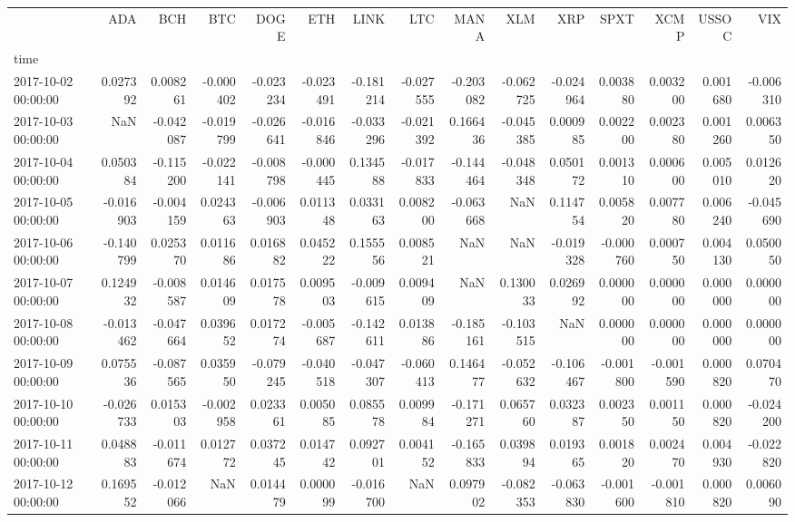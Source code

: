 \begin{tabular}{lrrrrrrrrrrrrrr}
\toprule
 & ADA & BCH & BTC & DOGE & ETH & LINK & LTC & MANA & XLM & XRP & SPXT & XCMP & USSOC & VIX \\
time &  &  &  &  &  &  &  &  &  &  &  &  &  &  \\
\midrule
2017-10-02 00:00:00 & 0.027392 & 0.008261 & -0.000402 & -0.023234 & -0.023491 & -0.181214 & -0.027555 & -0.203082 & -0.062725 & -0.024964 & 0.003880 & 0.003200 & 0.001680 & -0.006310 \\
2017-10-03 00:00:00 & NaN & -0.042087 & -0.019799 & -0.026641 & -0.016846 & -0.033296 & -0.021392 & 0.166436 & -0.045385 & 0.000985 & 0.002200 & 0.002380 & 0.001260 & 0.006350 \\
2017-10-04 00:00:00 & 0.050384 & -0.115200 & -0.022141 & -0.008798 & -0.000445 & 0.134588 & -0.017833 & -0.144464 & -0.048348 & 0.050172 & 0.001310 & 0.000600 & 0.005010 & 0.012620 \\
2017-10-05 00:00:00 & -0.016903 & -0.004159 & 0.024363 & -0.006903 & 0.011348 & 0.033163 & 0.008200 & -0.063668 & NaN & 0.114754 & 0.005820 & 0.007780 & 0.006240 & -0.045690 \\
2017-10-06 00:00:00 & -0.140799 & 0.025370 & 0.011686 & 0.016882 & 0.045222 & 0.155556 & 0.008521 & NaN & NaN & -0.019328 & -0.000760 & 0.000750 & 0.004130 & 0.050050 \\
2017-10-07 00:00:00 & 0.124932 & -0.008587 & 0.014609 & 0.017578 & 0.009503 & -0.009615 & 0.009409 & NaN & 0.130033 & 0.026992 & 0.000000 & 0.000000 & 0.000000 & 0.000000 \\
2017-10-08 00:00:00 & -0.013462 & -0.047664 & 0.039652 & 0.017274 & -0.005687 & -0.142611 & 0.013886 & -0.185161 & -0.103515 & NaN & 0.000000 & 0.000000 & 0.000000 & 0.000000 \\
2017-10-09 00:00:00 & 0.075536 & -0.087565 & 0.035950 & -0.079245 & -0.040518 & -0.047307 & -0.060413 & 0.146477 & -0.052632 & -0.106467 & -0.001800 & -0.001590 & 0.000820 & 0.070470 \\
2017-10-10 00:00:00 & -0.026733 & 0.015303 & -0.002958 & 0.023361 & 0.005085 & 0.085578 & 0.009984 & -0.171271 & 0.065760 & 0.032387 & 0.002350 & 0.001150 & 0.000820 & -0.024200 \\
2017-10-11 00:00:00 & 0.048883 & -0.011674 & 0.012772 & 0.037245 & 0.014742 & 0.092701 & 0.004152 & -0.165833 & 0.039894 & 0.019365 & 0.001820 & 0.002470 & 0.004930 & -0.022820 \\
2017-10-12 00:00:00 & 0.169552 & -0.012066 & NaN & 0.014479 & 0.000099 & -0.016700 & NaN & 0.097902 & -0.082353 & -0.063830 & -0.001600 & -0.001810 & 0.000820 & 0.006090 \\

\end{tabular}
